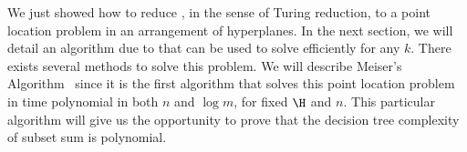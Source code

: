 We just showed how to reduce \kSUM, in the sense of Turing reduction, to a
point location problem in an arrangement of hyperplanes. In the next section,
we will detail an algorithm due to \citet*{meiser:1993} that can be used to
solve \kSUM efficiently for any $k$.  There exists several methods to solve
this problem. We will describe Meiser's Algorithm~\cite{meiser:1993} since it
is the first algorithm that solves this point location problem in time
polynomial in both $n$ and $\log m$, for fixed $\H$ and $n$. This particular
algorithm will give us the opportunity to prove that the decision tree complexity
of subset sum is polynomial.

